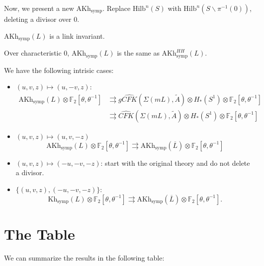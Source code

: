 Now, we present a new $\text{AKh}_{\text{symp}}$. Replace $\text{Hilb}^n(S)$ with $\text{Hilb}^n(S\backslash \pi^{-1}(0))$, deleting a divisor over $0$.

\begin{theorem}

$\text{AKh}_{\text{symp}}(L)$ is a link invariant.

\end{theorem}

\begin{conjecture}

Over characteristic 0, $\text{AKh}_{\text{symp}}(L)$ is the same as $\text{AKh}_{\text{symp}}^{HH}(L)$.

\end{conjecture}

We have the following intrisic cases:
\begin{itemize}
\item $(u,v,z)\mapsto (u,-v,z)$:
\begin{align*}
\text{AKh}_{\text{symp}}(L)\otimes \mathbb{F}_2[\theta, \theta^{-1}] & \rightrightarrows g\widehat{CFK}(\Sigma(mL), \tilde{A})\otimes H_*(S^1) \otimes \mathbb{F}_2[\theta, \theta^{-1}]  \\
& \rightrightarrows \widehat{CFK}(\Sigma(mL), \tilde{A})\otimes H_*(S^1) \otimes \mathbb{F}_2[\theta, \theta^{-1}]
\end{align*}
\item $(u,v,z)\mapsto (u,v,-z)$
\[
\text{AKh}_{\text{symp}}(L)\otimes \mathbb{F}_2[\theta, \theta^{-1}]\rightrightarrows \text{AKh}_{\text{symp}}(\overline{L})\otimes \mathbb{F}_2[\theta, \theta^{-1}]
\]
\item $(u,v,z)\mapsto (-u,-v, -z)$: start with the original theory and do not delete a divisor.
\item $\{ (u,v,z), (-u, -v, -z)\}$:
\[
\text{Kh}_{\text{symp}}(L)\otimes \mathbb{F}_2[\theta, \theta^{-1}]\rightrightarrows \text{AKh}_{\text{symp}}(\overline{L})\otimes \mathbb{F}_2[\theta, \theta^{-1}].
\]
\end{itemize}

\section{The Table}
We can summarize the results in the following table:

